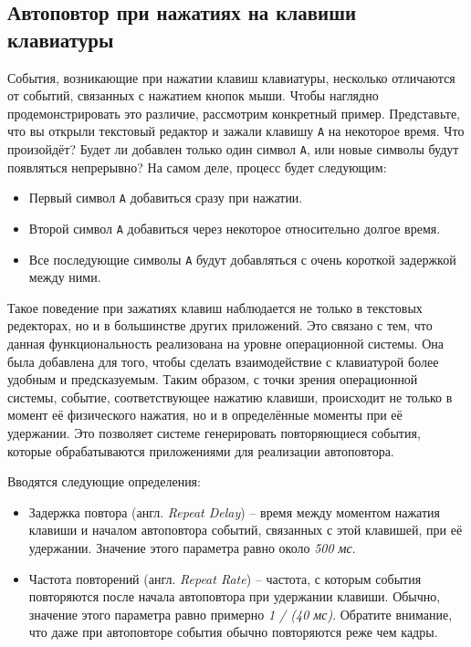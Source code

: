 \documentclass{article}
\begin{document}
\subsection*{Автоповтор при нажатиях на клавиши клавиатуры}
События, возникающие при нажатии клавиш клавиатуры, несколько отличаются от событий, связанных с нажатием кнопок мыши. Чтобы наглядно продемонстрировать это различие, рассмотрим конкретный пример. Представьте, что вы открыли текстовый редактор и зажали клавишу \texttt{A} на некоторое время. Что произойдёт? Будет ли добавлен только один символ \texttt{A}, или новые символы будут появляться непрерывно? На самом деле, процесс будет следующим:
\begin{itemize}
\item Первый символ \texttt{A} добавиться сразу при нажатии.
\item Второй символ \texttt{A} добавиться через некоторое относительно долгое время.
\item Все последующие символы \texttt{A} будут добавляться с очень короткой задержкой между ними.
\end{itemize}

Такое поведение при зажатиях клавиш наблюдается не только в текстовых редекторах, но и в большинстве других приложений. Это связано с тем, что данная функциональность реализована на уровне операционной системы. Она была добавлена для того, чтобы сделать взаимодействие с клавиатурой более удобным и предсказуемым.
Таким образом, с точки зрения операционной системы, событие, соответствующее нажатию клавиши, происходит не только в момент её физического нажатия, но и в определённые моменты при её удержании. Это позволяет системе генерировать повторяющиеся события, которые обрабатываются приложениями для реализации автоповтора.

Вводятся следующие определения:
\begin{itemize}
\item Задержка повтора (англ. \textit{Repeat Delay}) -- время между моментом нажатия клавиши и началом автоповтора событий, связанных с этой клавишей, при её удержании.
Значение этого параметра равно около \textit{500 мс}.
\item Частота повторений (англ. \textit{Repeat Rate}) -- частота, с которым события  повторяются после начала автоповтора при удержании клавиши.
Обычно, значение этого параметра равно примерно \textit{1 / (40 мс)}.
Обратите внимание, что даже при автоповторе события обычно повторяются реже чем кадры.
\end{itemize}
\end{document}
